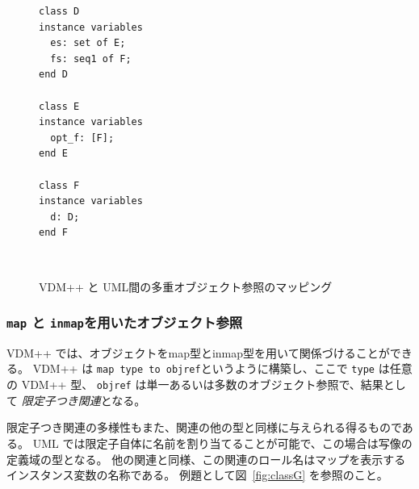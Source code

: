 \documentclass[\pformat,12pt]{jarticle}
\newcommand{\vdmpp}{VDM++}
\begin{document}
\begin{figure}[htb]
\begin{center}
\hspace{-2cm}\begin{minipage}[t]{2in}
\begin{verbatim}
class D  
instance variables  
  es: set of E;  
  fs: seq1 of F;  
end D  
  
class E  
instance variables  
  opt_f: [F];  
end E  
  
class F  
instance variables  
  d: D;  
end F  
\end{verbatim}
\end{minipage} \ \
\begin{minipage}[t]{2in}
\vspace{1cm}
\end{minipage}
\caption{\vdmpp{} と UML間の多重オブジェクト参照のマッピング　\label{fig:classD}}
\end{center}
\end{figure}

\subsubsection*{ {\tt map} と {\tt inmap}を用いたオブジェクト参照}


 \vdmpp{} では、オブジェクトをmap型とinmap型を用いて関係づけることができる。
\vdmpp{} は {\tt map type to objref}というように構築し、ここで {\tt  type} は任意の \vdmpp{} 型、 {\tt objref} は単一あるいは多数のオブジェクト参照で、結果として {\it 限定子つき関連}となる。

限定子つき関連の多様性もまた、関連の他の型と同様に与えられる得るものである。
 UML では限定子自体に名前を割り当てることが可能で、この場合は写像の定義域の型となる。
他の関連と同様、この関連のロール名はマップを表示するインスタンス変数の名称である。
例題として図~\ref{fig:classG} を参照のこと。
\end{document}
